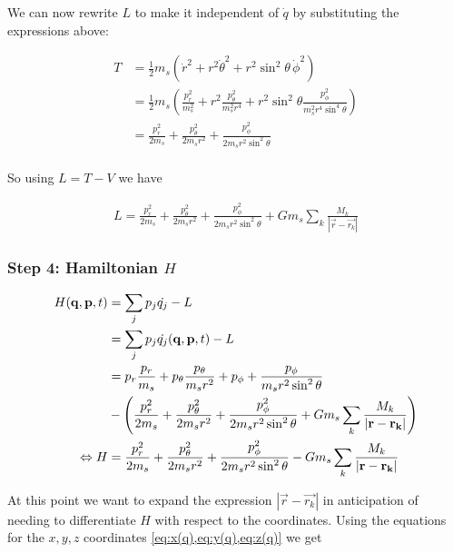 We can now rewrite \(L\) to make it independent of \(\dot{q}\) by substituting the expressions above:

\begin{align}
    T &= \frac{1}{2} m_s (\dot{r}^2 + r^2\dot{\theta}^2 + r^2\sin^2{\theta}\,\dot{\phi}^2) \\
    &= \frac{1}{2} m_s \left(\frac{p_r^2}{m_s^2} + r^2\frac{p_\theta^2}{m_s^2 r^4} + r^2\sin^2{\theta}\frac{p_\phi^2}{m_s^2 r^4 \sin^4{\theta}} \right) \\
    &= \frac{p_r^2}{2 m_s} + \frac{p_\theta^2}{2 m_s r^2} + \frac{p_\phi^2}{2 m_s r^2 \sin^2{\theta}} \\
\end{align}

So using \(L = T - V\) we have

\begin{align}
    L = \frac{p_r^2}{2 m_s} + \frac{p_\theta^2}{2 m_s r^2} + \frac{p_\phi^2}{2 m_s r^2 \sin^2{\theta}} + G m_s \sum\limits_{k} \frac{M_k}{\left| \vec{r} - \vec{r_k} \right|}
\end{align}

\subsubsection{Step 4: Hamiltonian \(H\)}
\begin{align}
    H(\vec{q}, \vec{p}, t) &= \sum\limits_{j}p_j \dot{q_j} - L \\
    &= \sum\limits_{j}p_j \dot{q_j}(\vec{q}, \vec{p}, t) - L \\
    &= p_r \frac{p_r}{m_s} + p_\theta \frac{p_\theta}{m_s r^2} + p_\phi + \frac{p_\phi}{m_s r^2 \sin^2{\theta}} \notag \\
    &- \left( \frac{p_r^2}{2 m_s} + \frac{p_\theta^2}{2 m_s r^2} + \frac{p_\phi^2}{2 m_s r^2 \sin^2{\theta}} + G m_s \sum\limits_{k} \frac{M_k}{\left| \vec{r} - \vec{r_k} \right|} \right) \\
    \Leftrightarrow H &= \frac{p_r^2}{2 m_s} + \frac{p_\theta^2}{2 m_s r^2} + \frac{p_\phi^2}{2 m_s r^2 \sin^2{\theta}} - G m_s \sum\limits_{k} \frac{M_k}{\left| \vec{r} - \vec{r_k} \right|}
\end{align}

At this point we want to expand the expression \(\left| \vec{r} - \vec{r_k} \right|\) in anticipation of needing to differentiate \(H\) with respect to the coordinates. Using the equations for the \(x, y, z\) coordinates \cref{eq:x(q),eq:y(q),eq:z(q)} we get

